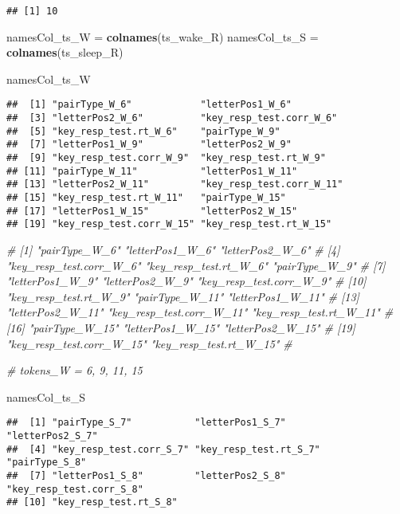 \documentclass[]{article}
\newenvironment{Shaded}{\begin{snugshade}}{\end{snugshade}}
\newcommand{\KeywordTok}[1]{\textcolor[rgb]{0.13,0.29,0.53}{\textbf{#1}}}
\newcommand{\StringTok}[1]{\textcolor[rgb]{0.31,0.60,0.02}{#1}}
\newcommand{\CommentTok}[1]{\textcolor[rgb]{0.56,0.35,0.01}{\textit{#1}}}
\newcommand{\NormalTok}[1]{#1}
\begin{document}
\begin{verbatim}
## [1] 10
\end{verbatim}

\begin{Shaded}
\begin{Highlighting}[]
\NormalTok{namesCol_ts_W =}\StringTok{ }\KeywordTok{colnames}\NormalTok{(ts_wake_R)}
\NormalTok{namesCol_ts_S =}\StringTok{ }\KeywordTok{colnames}\NormalTok{(ts_sleep_R)}

\NormalTok{namesCol_ts_W}
\end{Highlighting}
\end{Shaded}

\begin{verbatim}
##  [1] "pairType_W_6"            "letterPos1_W_6"         
##  [3] "letterPos2_W_6"          "key_resp_test.corr_W_6" 
##  [5] "key_resp_test.rt_W_6"    "pairType_W_9"           
##  [7] "letterPos1_W_9"          "letterPos2_W_9"         
##  [9] "key_resp_test.corr_W_9"  "key_resp_test.rt_W_9"   
## [11] "pairType_W_11"           "letterPos1_W_11"        
## [13] "letterPos2_W_11"         "key_resp_test.corr_W_11"
## [15] "key_resp_test.rt_W_11"   "pairType_W_15"          
## [17] "letterPos1_W_15"         "letterPos2_W_15"        
## [19] "key_resp_test.corr_W_15" "key_resp_test.rt_W_15"
\end{verbatim}

\begin{Shaded}
\begin{Highlighting}[]
\CommentTok{#  [1] "pairType_W_6"            "letterPos1_W_6"          "letterPos2_W_6"         }
\CommentTok{#  [4] "key_resp_test.corr_W_6"  "key_resp_test.rt_W_6"    "pairType_W_9"           }
\CommentTok{#  [7] "letterPos1_W_9"          "letterPos2_W_9"          "key_resp_test.corr_W_9" }
\CommentTok{# [10] "key_resp_test.rt_W_9"    "pairType_W_11"           "letterPos1_W_11"        }
\CommentTok{# [13] "letterPos2_W_11"         "key_resp_test.corr_W_11" "key_resp_test.rt_W_11"  }
\CommentTok{# [16] "pairType_W_15"           "letterPos1_W_15"         "letterPos2_W_15"        }
\CommentTok{# [19] "key_resp_test.corr_W_15" "key_resp_test.rt_W_15"}
\CommentTok{# }

\CommentTok{# tokens_W = 6, 9, 11, 15}

\NormalTok{namesCol_ts_S}
\end{Highlighting}
\end{Shaded}

\begin{verbatim}
##  [1] "pairType_S_7"           "letterPos1_S_7"         "letterPos2_S_7"        
##  [4] "key_resp_test.corr_S_7" "key_resp_test.rt_S_7"   "pairType_S_8"          
##  [7] "letterPos1_S_8"         "letterPos2_S_8"         "key_resp_test.corr_S_8"
## [10] "key_resp_test.rt_S_8"
\end{verbatim}
\end{document}
